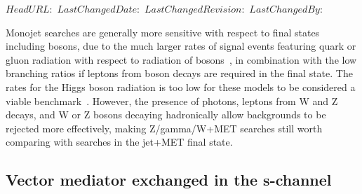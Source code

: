 \svnidlong
{$HeadURL: $}
{$LastChangedDate: $}
{$LastChangedRevision: $}
{$LastChangedBy: $}


Monojet searches are generally more sensitive
with respect to final states including bosons, due to the much
larger rates of signal events featuring quark or gluon radiation with
respect to radiation of bosons~\cite{Zhou:2013fla},
in combination with the low branching ratios if leptons from
boson decays are required in the final state.
The rates for the Higgs boson radiation is too low for these models
to be considered a viable benchmark~\cite{Carpenter:2013xra}.
However, the presence of photons,
leptons from W and Z decays,
and W or Z bosons decaying hadronically
allow backgrounds to be rejected more effectively,
making Z/gamma/W+MET searches
still worth comparing with searches in the jet+MET final state.


\subsection{Vector mediator exchanged in the s-channel}

